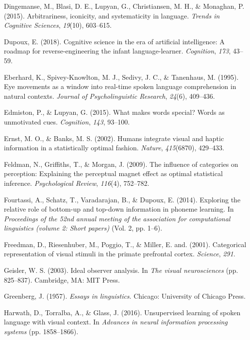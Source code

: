 \documentclass[english,,man,floatsintext]{apa6}
\theoremstyle{definition}
\theoremstyle{definition}
\theoremstyle{definition}
\theoremstyle{remark}
\begin{document}
\hypertarget{ref-dingemanse2015}{}
Dingemanse, M., Blasi, D. E., Lupyan, G., Christiansen, M. H., \&
Monaghan, P. (2015). Arbitrariness, iconicity, and systematicity in
language. \emph{Trends in Cognitive Sciences}, \emph{19}(10), 603--615.

\hypertarget{ref-dupoux2018}{}
Dupoux, E. (2018). Cognitive science in the era of artificial
intelligence: A roadmap for reverse-engineering the infant
language-learner. \emph{Cognition}, \emph{173}, 43--59.

\hypertarget{ref-Eberhard1995}{}
Eberhard, K., Spivey-Knowlton, M. J., Sedivy, J. C., \& Tanenhaus, M.
(1995). Eye movements as a window into real-time spoken language
comprehension in natural contexts. \emph{Journal of Psycholinguistic
Research}, \emph{24}(6), 409--436.

\hypertarget{ref-edmiston2015}{}
Edmiston, P., \& Lupyan, G. (2015). What makes words special? Words as
unmotivated cues. \emph{Cognition}, \emph{143}, 93--100.

\hypertarget{ref-ernst02}{}
Ernst, M. O., \& Banks, M. S. (2002). Humans integrate visual and haptic
information in a statistically optimal fashion. \emph{Nature},
\emph{415}(6870), 429--433.

\hypertarget{ref-feldman2009}{}
Feldman, N., Griffiths, T., \& Morgan, J. (2009). The influence of
categories on perception: Explaining the perceptual magnet effect as
optimal statistical inference. \emph{Psychological Review},
\emph{116}(4), 752--782.

\hypertarget{ref-fourtassi2014b}{}
Fourtassi, A., Schatz, T., Varadarajan, B., \& Dupoux, E. (2014).
Exploring the relative role of bottom-up and top-down information in
phoneme learning. In \emph{Proceedings of the 52nd annual meeting of the
association for computational linguistics (volume 2: Short papers)}
(Vol. 2, pp. 1--6).

\hypertarget{ref-freedman2001}{}
Freedman, D., Riesenhuber, M., Poggio, T., \& Miller, E. and. (2001).
Categorical representation of visual stimuli in the primate prefrontal
cortex. \emph{Science}, \emph{291}.

\hypertarget{ref-Geisler2003}{}
Geisler, W. S. (2003). Ideal observer analysis. In \emph{The visual
neurosciences} (pp. 825--837). Cambridge, MA: MIT Press.

\hypertarget{ref-greenberg1957}{}
Greenberg, J. (1957). \emph{Essays in linguistics}. Chicago: University
of Chicago Press.

\hypertarget{ref-harwath2016}{}
Harwath, D., Torralba, A., \& Glass, J. (2016). Unsupervised learning of
spoken language with visual context. In \emph{Advances in neural
information processing systems} (pp. 1858--1866).
\end{document}

